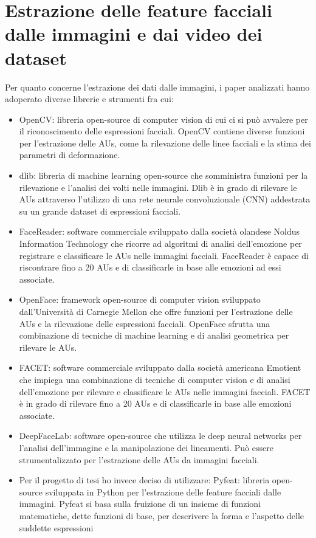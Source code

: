 \section{Estrazione delle feature facciali dalle immagini e dai video dei dataset}
Per quanto concerne l’estrazione dei dati dalle immagini, i paper analizzati hanno adoperato diverse librerie e strumenti fra cui:
\begin{itemize}
    \item OpenCV: libreria open-source di computer vision di cui ci si può avvalere per il riconoscimento delle espressioni facciali. OpenCV contiene diverse funzioni per l'estrazione delle AUs, come la rilevazione delle linee facciali e la stima dei parametri di deformazione.
    \item dlib: libreria di machine learning open-source che somministra funzioni per la rilevazione e l'analisi dei volti nelle immagini. Dlib è in grado di rilevare le AUs attraverso l'utilizzo di una rete neurale convoluzionale (CNN) addestrata su un grande dataset di espressioni facciali.
    \item FaceReader: software commerciale sviluppato dalla società olandese Noldus Information Technology che ricorre ad algoritmi di analisi dell'emozione per registrare e classificare le AUs nelle immagini facciali. FaceReader è capace di riscontrare fino a 20 AUs e di classificarle in base alle emozioni ad essi associate.
    \item OpenFace: framework open-source di computer vision sviluppato dall'Università di Carnegie Mellon che offre funzioni per l'estrazione delle AUs e la rilevazione delle espressioni facciali. OpenFace sfrutta una combinazione di tecniche di machine learning e di analisi geometrica per rilevare le AUs.
    \item FACET: software commerciale sviluppato dalla società americana Emotient che impiega una combinazione di tecniche di computer vision e di analisi dell'emozione per rilevare e classificare le AUs nelle immagini facciali. FACET è in grado di rilevare fino a 20 AUs e di classificarle in base alle emozioni associate.
    \item DeepFaceLab: software open-source che utilizza le deep neural networks per l'analisi dell'immagine e la manipolazione dei lineamenti. Può essere strumentalizzato per l'estrazione delle AUs da immagini facciali. 
    \item Per il progetto di tesi ho invece deciso di utilizzare:
    Pyfeat: libreria open-source sviluppata in Python per l’estrazione delle feature
    facciali dalle immagini. Pyfeat si basa sulla fruizione di un insieme di funzioni
    matematiche, dette funzioni di base, per descrivere la forma e l’aspetto delle suddette
    espressioni
\end{itemize}

